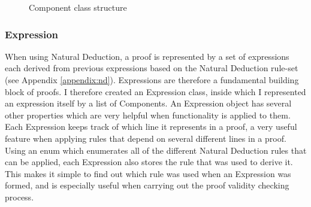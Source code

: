 \begin{figure}[!ht]
	\centering
	\caption{Component class structure}
\end{figure}

\subsubsection{Expression}

When using Natural Deduction, a proof is represented by a set of expressions each derived from previous expressions based on the Natural Deduction rule-set (see Appendix \ref{appendix:nd}). Expressions are therefore a fundamental building block of proofs. I therefore created an Expression class, inside which I represented an expression itself by a list of Components. An Expression object has several other properties which are very helpful when functionality is applied to them. Each Expression keeps track of which line it represents in a proof, a very useful feature when applying rules that depend on several different lines in a proof. Using an enum which enumerates all of the different Natural Deduction rules that can be applied, each Expression also stores the rule that was used to derive it. This makes it simple to find out which rule was used when an Expression was formed, and is especially useful when carrying out the proof validity checking process.


